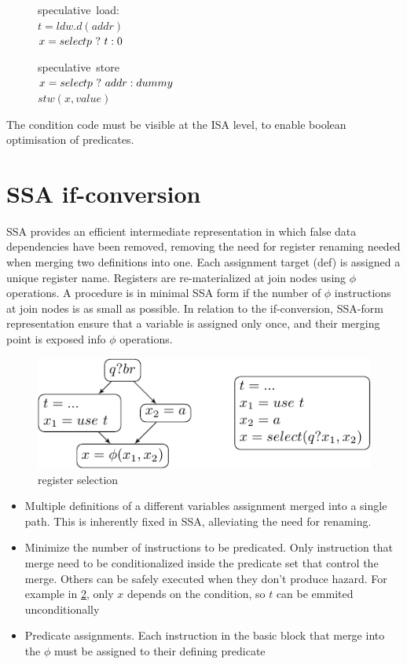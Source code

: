 \begin{figure}
\begin{minipage}[t]{4cm}
\mbox{speculative load:} \\
$t = ldw.d(addr) $ \\
$x = select p ~?~ t : 0 $ \\
\end{minipage}
\begin{minipage}[t]{4cm}
\mbox{speculative store} \\
$x=select p ~?~ addr : dummy $ \\
$stw (x, value) $
\end{minipage}
\label{fig:spec}
\end{figure}

The condition code must be visible at the ISA level, to enable boolean optimisation of predicates.

\section{SSA if-conversion}

SSA provides an efficient intermediate representation in which false data dependencies have been removed, removing the need for register renaming needed when merging two definitions into one. Each assignment target (def) is assigned a unique register name. Registers are re-materialized at join nodes using $\phi$ operations. A procedure is in minimal SSA form if the number of $\phi$ instructions at join nodes is as small as possible. In relation to the if-conversion, SSA-form representation ensure that a variable is assigned only once, and their merging point is exposed info $\phi$ operations.

\begin{figure}
\centering
    \includegraphics[scale=0.8]{ssa.pdf}
\caption{register selection}
\label{fig:ssa1}
\end{figure}

\begin{itemize}
\item Multiple definitions of a different variables assignment merged into a single path. This is inherently fixed in SSA, alleviating the need for renaming.
\item Minimize the number of instructions to be predicated. Only instruction that merge need to be conditionalized inside the predicate set that control the merge. Others can be safely executed when they don't produce hazard. For example in \ref{fig:ssa1}, only $x$ depends on the condition, so $t$ can be emmited unconditionally
\item Predicate assignments. Each instruction in the basic block that merge into the $\phi$ must be assigned to their defining predicate
\end {itemize}

